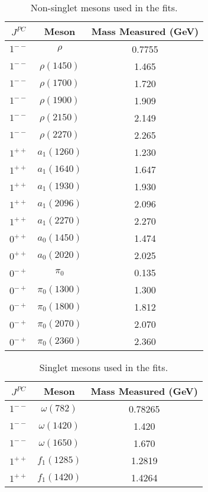 \documentclass[10 pt]{article}
\begin{document}
\begin{table}
\centering
\begin{tabular}{ | c | c | c | }

\hline
$J^{PC}$ & Meson & Mass Measured (GeV) \\
\hline
$1^{--}$ & $\rho$ & 0.7755 \\
\hline
$1^{--}$ &  $\rho(1450)$ & 1.465 \\
\hline
$1^{--}$ & $\rho(1700)$ & 1.720 \\
\hline
$1^{--}$ & $\rho(1900)$ & 1.909 \\
\hline
$1^{--}$ & $\rho(2150)$ & 2.149 \\
\hline
$1^{--}$ & $\rho(2270)$ & 2.265\\
\hline
$1^{++}$ & $a_1(1260)$ & 1.230\\
\hline
$1^{++}$ & $a_1(1640)$ & 1.647 \\
\hline
$1^{++}$ & $a_1(1930)$ & 1.930 \\
\hline
$1^{++}$ & $a_1(2096)$ & 2.096 \\
\hline
$1^{++}$ & $a_1(2270)$ & 2.270 \\
\hline
$0^{++}$ &  $a_0(1450)$ & 1.474 \\
\hline
$0^{++}$ &  $a_0(2020)$ & 2.025 \\
\hline
$0^{-+}$ &  $\pi_0$ & 0.135 \\
\hline
$0^{-+}$ &  $\pi_0(1300)$ & 1.300 \\
\hline
$0^{-+}$ &  $\pi_0(1800)$ & 1.812 \\
\hline
$0^{-+}$ &  $\pi_0(2070)$ & 2.070 \\
\hline
$0^{-+}$ &  $\pi_0(2360)$ & 2.360 \\
\hline
\end{tabular}
\caption{Non-singlet mesons used in the fits.}
\label{table: ns mesons} 
\end{table}

\begin{table}
\centering
\begin{tabular}{ | c | c | c | }

\hline
$J^{PC}$ & Meson & Mass Measured (GeV) \\
\hline
$1^{--}$ & $\omega(782)$ & 0.78265 \\
\hline
$1^{--}$ &  $\omega(1420)$ & 1.420\\
\hline
$1^{--}$ & $\omega(1650)$ & 1.670 \\
\hline
$1^{++}$ & $f_1(1285)$ & 1.2819\\
\hline
$1^{++}$ & $f_1(1420)$ & 1.4264 \\
\hline
\end{tabular}
\caption{Singlet mesons used in the fits.}
\label{table: s mesons} 
\end{table}
\end{document}
